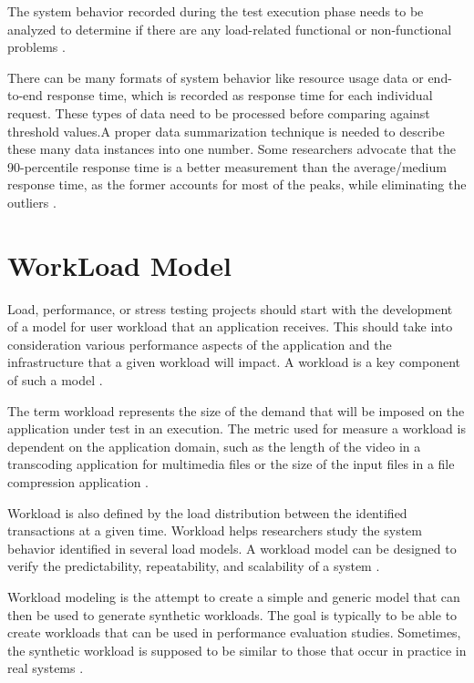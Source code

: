 \documentclass[times]{stvrauth}
\begin{document}
The system behavior recorded during the test execution phase needs to be analyzed to determine if there are any load-related functional or non-functional problems \cite{Jiang2010}.

There can be many formats of system behavior like resource usage data or end-to-end response time, which is recorded as response time for each individual request. These types of data need to be processed before comparing against threshold values.A proper data summarization technique is needed to describe these many data instances into one number. Some researchers advocate that the 90-percentile response time is a better measurement than the average/medium response time, as the former accounts for most of the peaks, while eliminating the outliers \cite{Jiang2010}.




\section{WorkLoad Model}

Load, performance, or stress testing projects should start with the development of a model for user workload that an application receives. This should take into consideration various performance aspects of the application and the infrastructure that a given workload will impact. A workload is a key component of such a model \cite{Molyneaux2009}.

The term workload represents the size of the demand that will be imposed on the application under test in an execution. The metric  used for measure a workload is dependent on the application domain, such as the length of the video in a transcoding application for multimedia files or the size of the input files in a file compression application \cite{Feitelson2013} \cite{Molyneaux2009} \cite{Goncalves2014}. 

Workload is also defined by the load distribution between the identified transactions at a given time. Workload helps researchers study the system behavior identified in several load models. A workload model can be designed to verify the predictability, repeatability, and scalability of a system \cite{Feitelson2013} \cite{Molyneaux2009}.


Workload modeling is the attempt to create a simple and generic model that can then be used to generate synthetic workloads. The goal is typically to be able to create workloads that can be used in performance evaluation studies. Sometimes, the synthetic workload is supposed to be similar to those that occur in practice in real systems \cite{Feitelson2013} \cite{Molyneaux2009}.
\end{document}
